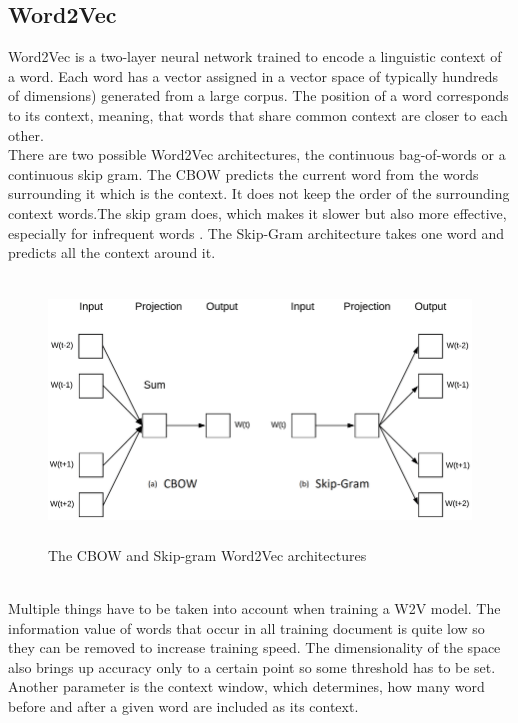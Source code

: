 \subsection{Word2Vec}
Word2Vec is a two-layer neural network trained to encode a linguistic context of a word. Each word has a vector assigned in a vector space of typically hundreds of dimensions) generated from a large corpus. The position of a word corresponds to its context, meaning, that words that share common context are closer to each other. \\
There are two possible Word2Vec architectures, the continuous bag-of-words or a continuous skip gram. The CBOW predicts the current word from the words surrounding it which is the context. It does not keep the order of the surrounding context words.The skip gram does, which makes it slower but also more effective, especially for infrequent words \cite{DBLP:journals/corr/abs-1301-3781}. The Skip-Gram architecture takes one word and predicts all the context around it.
\begin{figure}[h]
    \centering
	\includegraphics[height=70mm]{./img/cbow_skipgram_w2v_architecture.png}
	\caption{The CBOW and Skip-gram Word2Vec architectures}
	\label{fig:cbow_skipgram_w2v_architecture}
\end{figure}
\\
Multiple things have to be taken into account when training a W2V model. The information value of words that occur in all training document is quite low so they can be removed to increase training speed. The dimensionality of the space also brings up accuracy only to a certain point so some threshold has to be set. Another parameter is the context window, which determines, how many word before and after a given word are included as its context.

